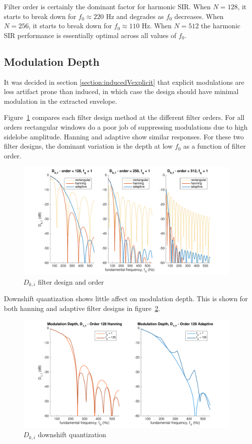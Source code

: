 \documentclass [11pt, proquest,oneside] {ganter_thesis}[2015/03/03]
\begin{document}
Filter order is certainly the dominant factor for harmonic SIR.  When $N = 128$, it starts to break down for $f_0 \approx 220$ Hz and degrades as $f_0$ decreases.  When $N = 256$, it starts to break down for $f_0 \approx 110$ Hz.  When $N = 512$ the harmonic SIR performance is essentially optimal across all values of $f_0$.

\clearpage

\subsection{Modulation Depth}

It was decided in section \ref{section:inducedVexplicit} that explicit modulations are less artifact prone than induced, in which case the design should have minimal modulation in the extracted envelope.

Figure~\ref{fig:d_ki_1} compares each filter design method at the different filter orders.  For all orders rectangular windows do a poor job of suppressing modulations due to high sidelobe amplitude.  Hanning and adaptive show similar responses.  For these two filter designs, the dominant variation is the depth at low $f_0$ as a function of filter order.

\begin{figure}[!ht]
  \centering
    \includegraphics[width=1\textwidth]{d_ki_1}   
    \caption{$D_{k,i}$ filter design and order}\label{fig:d_ki_1}
\end{figure}

Downshift quantization shows little affect on modulation depth.  This is shown for both hanning and adaptive filter designs in figure~\ref{fig:d_ki_2}.

\begin{figure}[!ht]
  \centering
    \includegraphics[width=1\textwidth]{d_ki_2}
    \caption{$D_{k,i}$ downshift quantization}\label{fig:d_ki_2}
\end{figure}
\end{document}
